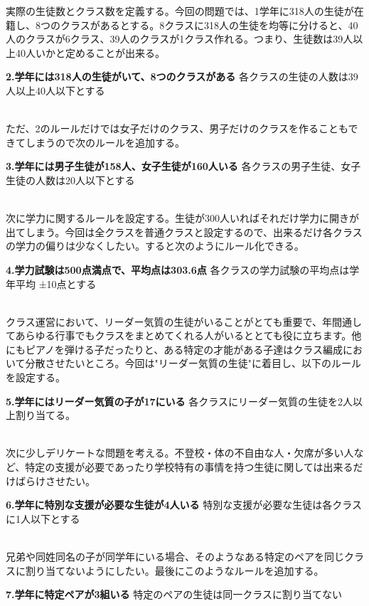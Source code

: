 \documentclass{jsarticle}
\begin{document}
実際の生徒数とクラス数を定義する。今回の問題では、1学年に318人の生徒が在籍し、8つのクラスがあるとする。8クラスに318人の生徒を均等に分けると、40人のクラスが6クラス、39人のクラスが1クラス作れる。つまり、生徒数は39人以上40人いかと定めることが出来る。
\begin{itembox}[l]{{\bf 2.学年には318人の生徒がいて、8つのクラスがある}}
	各クラスの生徒の人数は39人以上40人以下とする
\end{itembox}\\


ただ、2のルールだけでは女子だけのクラス、男子だけのクラスを作ることもできてしまうので次のルールを追加する。
\begin{itembox}[l]{{\bf 3.学年には男子生徒が158人、女子生徒が160人いる}}
	各クラスの男子生徒、女子生徒の人数は20人以下とする
\end{itembox}\\


次に学力に関するルールを設定する。生徒が300人いればそれだけ学力に開きが出てしまう。今回は全クラスを普通クラスと設定するので、出来るだけ各クラスの学力の偏りは少なくしたい。すると次のようにルール化できる。
\begin{itembox}[l]{{\bf 4.学力試験は500点満点で、平均点は303.6点}}
	各クラスの学力試験の平均点は学年平均 ±10点とする
\end{itembox}\\


クラス運営において、リーダー気質の生徒がいることがとても重要で、年間通してあらゆる行事でもクラスをまとめてくれる人がいるととても役に立ちます。他にもピアノを弾ける子だったりと、ある特定の才能がある子達はクラス編成において分散させたいところ。今回は"リーダー気質の生徒"に着目し、以下のルールを設定する。
\begin{itembox}[l]{{\bf 5.学年にはリーダー気質の子が17にいる}}
	各クラスにリーダー気質の生徒を2人以上割り当てる。
\end{itembox}\\

次に少しデリケートな問題を考える。不登校・体の不自由な人・欠席が多い人など、特定の支援が必要であったり学校特有の事情を持つ生徒に関しては出来るだけばらけさせたい。
\begin{itembox}[l]{{\bf 6.学年に特別な支援が必要な生徒が4人いる}}
	特別な支援が必要な生徒は各クラスに1人以下とする
\end{itembox}\\


兄弟や同姓同名の子が同学年にいる場合、そのようなある特定のペアを同じクラスに割り当てないようにしたい。最後にこのようなルールを追加する。
\begin{itembox}[l]{{\bf 7.学年に特定ペアが3組いる}}
	特定のペアの生徒は同一クラスに割り当てない
\end{itembox}\\
\end{document}
